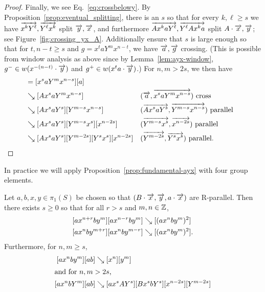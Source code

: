 \begin{proof}
  Finally, we see Eq.~\eqref{eq:crossbelowy}. By
  Proposition~\ref{prop:eventual_splitting}, there is an $s$ so that
  for every $k,\ell \geq s$ we have
  $\overrightarrow{x^k Y^\ell},\overrightarrow{Y^\ell x^k}$ split $\overrightarrow{y},\overrightarrow{x}$, and
  furthermore $\overrightarrow{A x^k a Y^\ell},\overrightarrow{Y^\ell A x^k a}$ split $A \cdot
  \overrightarrow{x}, \overrightarrow{y}$; see
  Figure~\ref{fig:crossing_yx_A}.
  Additionally ensure that $s$ is large enough so that for $t, n-t
  \ge s$ and
  $g = x^t a Y^m x^{n-t}$, we have $\overrightarrow{a},\overrightarrow{g}$ crossing. (This
  is possible from window analysis as above since by
  Lemma~\ref{lem:ayx-window}, $g^- \in w(x^{-(n-t)} \cdot \overrightarrow{y})$ and
  $g^+ \in w(x^t a \cdot \overrightarrow{y})$.)
  For $n,m > 2s$, we
  then have
  \begin{align*}
    [a Y^m x^n] [a] &= [x^s a Y^m x^{n-s}] [a] \\
    &\reducesto [A x^s a Y^m x^{n-s}]
      &&\text{$(\ora{a}, \ora{x^s a Y^m x^{n-s}})$ cross}\\
    &\reducesto [A x^s a Y^s] [Y^{m-s} x^{n-s}]
      &&\text{$(\ora{A x^s a Y^s}, \ora{Y^{m-s} x^{n-s}})$ parallel}\\
    &\reducesto [A x^s a Y^s] [Y^{m-s} x^s] [x^{n-2s}]
      &&\text{$(\ora{Y^{m-s} x^s}, \ora{x^{n-2s}})$ parallel}\\
    &\reducesto [A x^s a Y^s] [Y^{m-2s}] [Y^s x^s] [x^{n-2s}]
      &&\text{$(\ora{Y^{m-2s}}, \ora{Y^s x^s})$ parallel.} \qedhere
  \end{align*}
\end{proof}

\begin{figure}
\end{figure}

In practice we will apply Proposition~\ref{prop:fundamental-ayx} with
four group elements.
\begin{corollary}\label{cor:fund-axby}
  Let $a,b,x,y \in \pi_1(S)$ be chosen so that $(B\cdot \overrightarrow{x},
  \overrightarrow{y}, a\cdot\overrightarrow{x})$ are R-parallel.
  Then there exists
  $s \ge 0$ so that for all $r > s$ and $m,n \in \mathbb{Z}$,
  \begin{align}
    \label{eq:axby-cross-n}
       [a x^{n+r} by^m][ax^{n-r} by^m] &\mathrel{\searrow} [(ax^n by^m)^2]\\
    \label{eq:axby-cross-m}
       [ax^n by^{m+r}][ax^n by^{m-r}] &\mathrel{\searrow} [(ax^n by^m)^2].
  \end{align}
  Furthermore, for $n,m \ge s$,
\begin{align}\label{eq:cancel-axby}
  [a x^n b y^m][ab] &\mathrel{\searrow} [x^n][y^m]\\
  \intertext{and for $n,m > 2s$,}
  \label{eq:crossbelowy-ab}
   [a x^n b Y^m][ab] &\mathrel{\searrow} [a x^s A Y^s] [B x^s b Y^s] [x^{n-2s}] [Y^{m-2s}]
\end{align}
\end{corollary}

